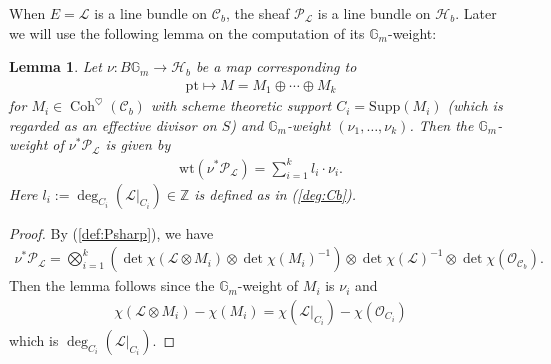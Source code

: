 \documentclass[11pt,oneside,a4paper,mathscr]{amsart}
\newtheorem{lemma}[thm]{Lemma}
\theoremstyle{definition}
\newcommand{\cH}{\mathcal{H}}
\newcommand{\cL}{\mathcal{L}}
\newcommand{\cC}{\mathcal{C}}
\newcommand{\cP}{\mathcal{P}}
\newcommand{\cO}{\mathcal{O}}
\newcommand{\bgm}{B\mathbb{G}_m}
\newcommand{\Coh}{\operatorname{Coh}}
\newcommand{\wt}{\mathrm{wt}}
\begin{document}
When $E=\cL$ is a line bundle on $\cC_b$, the sheaf $\cP_{\cL}$ is a line 
bundle on $\cH_b$. Later we will use the following lemma on the computation 
of its $\mathbb{G}_m$-weight: 
\begin{lemma}\label{lem:PLGm}
Let $\nu \colon \bgm \to \cH_b$ be a map corresponding to 
\begin{align*}
    \mathrm{pt}\mapsto M=M_1 \oplus \cdots \oplus M_k
\end{align*}
for $M_i \in \Coh^{\heartsuit}(\cC_b)$ 
with scheme theoretic support $C_i=\mathrm{Supp}(M_i)$ (which is regarded as an effective divisor on $S$) and 
$\mathbb{G}_m$-weight $(\nu_1, \ldots, \nu_k)$. 
Then the $\mathbb{G}_m$-weight of $\nu^* \cP_{\cL}$ is given by 
\begin{align*}
    \wt(\nu^* \cP_{\cL})=\sum_{i=1}^k l_i \cdot \nu_i.
\end{align*}
Here $l_i:=\deg_{C_i}(\cL|_{C_i})\in \mathbb{Z}$ is defined as in (\ref{deg:Cb}). 
\end{lemma}
\begin{proof}
By (\ref{def:Psharp}), we have 
\begin{align*}
  \nu^* \cP_{\cL}=\bigotimes_{i=1}^k \left(\det \chi(\cL\otimes M_i)\otimes \det \chi(M_i)^{-1}\right) \otimes \det \chi(\cL)^{-1}\otimes \det \chi(\cO_{\cC_b}).
\end{align*}
Then the lemma follows since the $\mathbb{G}_m$-weight of $M_i$ is $\nu_i$ 
and 
\begin{align*}
    \chi(\cL\otimes M_i)-\chi(M_i)=\chi(\cL|_{C_i})-\chi(\cO_{C_i})
\end{align*}
which is $\deg_{C_i}(\cL|_{C_i})$.
\end{proof}
\end{document}

